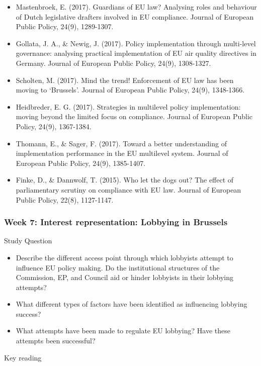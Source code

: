 \begin{itemize}
	\item Mastenbroek, E. (2017). Guardians of EU law? Analysing roles and behaviour of Dutch legislative drafters involved in EU compliance. Journal of European Public Policy, 24(9), 1289-1307.
	\item Gollata, J. A., \& Newig, J. (2017). Policy implementation through multi-level governance: analysing practical implementation of EU air quality directives in Germany. Journal of European Public Policy, 24(9), 1308-1327.
	\item Scholten, M. (2017). Mind the trend! Enforcement of EU law has been moving to ‘Brussels’. Journal of European Public Policy,  24(9), 1348-1366.
	\item Heidbreder, E. G. (2017). Strategies in multilevel policy implementation: moving beyond the limited focus on compliance. Journal of European Public Policy,  24(9), 1367-1384.
	\item Thomann, E., \& Sager, F. (2017). Toward a better understanding of implementation performance in the EU multilevel system. Journal of European Public Policy, 24(9), 1385-1407.
	\item Finke, D., \& Dannwolf, T. (2015). Who let the dogs out? The effect of parliamentary scrutiny on compliance with EU law. Journal of European Public Policy, 22(8), 1127-1147.
\end{itemize}


\subsubsection*{Week 7: Interest representation: Lobbying in Brussels}

Study Question

\begin{itemize}
	\item Describe the different access point through which lobbyists attempt to influence EU policy making. Do the institutional structures of the Commission, EP, and Council aid or hinder lobbyists in their lobbying attempts?
	\item What different types of factors have been identified as influencing lobbying success?
	\item What attempts have been made to regulate EU lobbying? Have these attempts been successful?
\end{itemize}

\noindent Key reading

